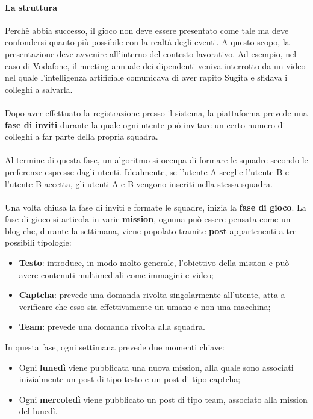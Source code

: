 \paragraph{La struttura}
Perchè abbia successo, il gioco non deve essere presentato come tale ma deve confondersi quanto più possibile con la realtà degli eventi. A questo scopo, la presentazione deve avvenire all'interno del contesto lavorativo. Ad esempio, nel caso di Vodafone, il meeting annuale dei dipendenti veniva interrotto da un video nel quale l'intelligenza artificiale comunicava di aver rapito Sugita e sfidava i colleghi a salvarla.
\\ \\
Dopo aver effettuato la registrazione presso il sistema, la piattaforma prevede una \textbf{fase di inviti} durante la quale ogni utente può invitare un certo numero di colleghi a far parte della propria squadra.
\\ \\
Al termine di questa fase, un algoritmo si occupa di formare le squadre secondo le preferenze espresse dagli utenti. Idealmente, se l'utente A sceglie l’utente B e l’utente B accetta, gli utenti A e B vengono inseriti nella stessa squadra.
\\ \\
Una volta chiusa la fase di inviti e formate le squadre, inizia la \textbf{fase di gioco}. 
La fase di gioco si articola in varie \textbf{mission}, ognuna può essere pensata come un blog che, durante la settimana, viene popolato tramite \textbf{post} appartenenti a tre possibili tipologie: 
\begin{itemize}
	\item \textbf{Testo}: introduce, in modo molto generale, l’obiettivo della mission e può avere contenuti multimediali come immagini e video;
	\item \textbf{Captcha}: prevede una domanda rivolta singolarmente all'utente, atta a verificare che esso sia effettivamente un umano e non una macchina;
	\item \textbf{Team}: prevede una domanda rivolta alla squadra. 
\end{itemize}

In questa fase, ogni settimana prevede due momenti chiave:
\begin{itemize}
	\item Ogni \textbf{lunedì} viene pubblicata una nuova mission, alla quale sono associati inizialmente un post di tipo testo e un post di tipo captcha;
	\item Ogni \textbf{mercoledì} viene pubblicato un post di tipo team, associato alla mission del lunedì.
\end{itemize}

